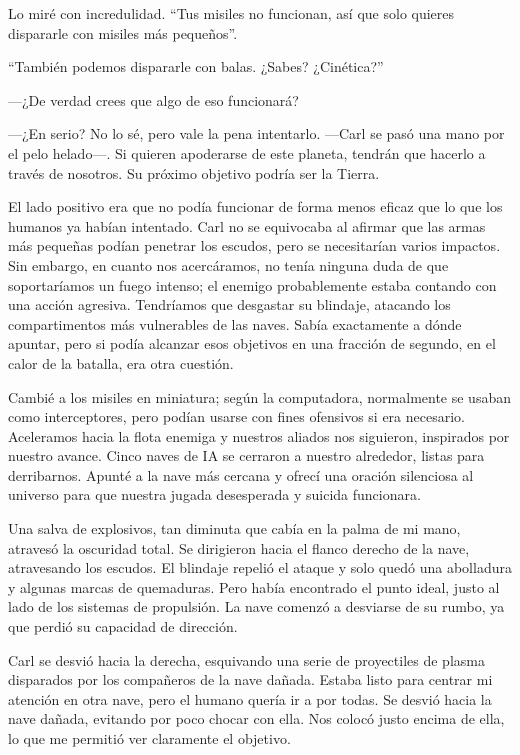 Lo miré con incredulidad. ``Tus misiles no funcionan, así que solo quieres dispararle con misiles más pequeños''.

``También podemos dispararle con balas. ¿Sabes? ¿Cinética?''

—¿De verdad crees que algo de eso funcionará?

—¿En serio? No lo sé, pero vale la pena intentarlo. —Carl se pasó una mano por el pelo helado—. Si quieren apoderarse de este planeta, tendrán que hacerlo a través de nosotros. Su próximo objetivo podría ser la Tierra.

El lado positivo era que no podía funcionar de forma menos eficaz que lo que los humanos ya habían intentado. Carl no se equivocaba al afirmar que las armas más pequeñas podían penetrar los escudos, pero se necesitarían varios impactos. Sin embargo, en cuanto nos acercáramos, no tenía ninguna duda de que soportaríamos un fuego intenso; el enemigo probablemente estaba contando con una acción agresiva. Tendríamos que desgastar su blindaje, atacando los compartimentos más vulnerables de las naves. Sabía exactamente a dónde apuntar, pero si podía alcanzar esos objetivos en una fracción de segundo, en el calor de la batalla, era otra cuestión.

Cambié a los misiles en miniatura; según la computadora, normalmente se usaban como interceptores, pero podían usarse con fines ofensivos si era necesario. Aceleramos hacia la flota enemiga y nuestros aliados nos siguieron, inspirados por nuestro avance. Cinco naves de IA se cerraron a nuestro alrededor, listas para derribarnos. Apunté a la nave más cercana y ofrecí una oración silenciosa al universo para que nuestra jugada desesperada y suicida funcionara.

Una salva de explosivos, tan diminuta que cabía en la palma de mi mano, atravesó la oscuridad total. Se dirigieron hacia el flanco derecho de la nave, atravesando los escudos. El blindaje repelió el ataque y solo quedó una abolladura y algunas marcas de quemaduras. Pero había encontrado el punto ideal, justo al lado de los sistemas de propulsión. La nave comenzó a desviarse de su rumbo, ya que perdió su capacidad de dirección.

Carl se desvió hacia la derecha, esquivando una serie de proyectiles de plasma disparados por los compañeros de la nave dañada. Estaba listo para centrar mi atención en otra nave, pero el humano quería ir a por todas. Se desvió hacia la nave dañada, evitando por poco chocar con ella. Nos colocó justo encima de ella, lo que me permitió ver claramente el objetivo.

